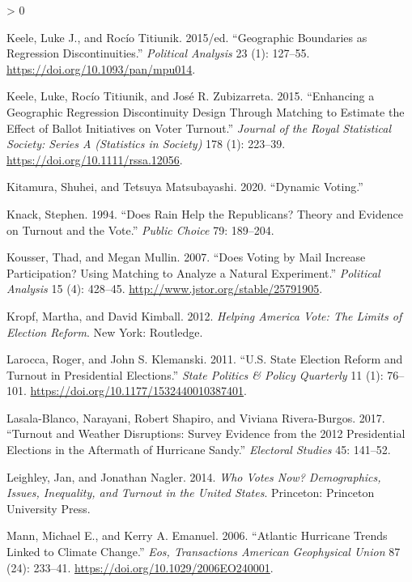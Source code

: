 \documentclass[
  12pt,
]{article}
\newlength{\cslhangindent}
\newenvironment{CSLReferences}[2] %
 {%
  \setlength{\parindent}{0pt}
  \ifodd #1 \everypar{\setlength{\hangindent}{\cslhangindent}}\ignorespaces\fi
  \ifnum #2 > 0
  \setlength{\parskip}{#2\baselineskip}
  \fi
 }%
 {}
\begin{document}
\begin{CSLReferences}{1}{0}
\leavevmode\hypertarget{ref-Keele2015}{}%
Keele, Luke J., and Rocío Titiunik. 2015/ed. {``Geographic {Boundaries} as {Regression Discontinuities}.''} \emph{Political Analysis} 23 (1): 127--55. \url{https://doi.org/10.1093/pan/mpu014}.

\leavevmode\hypertarget{ref-Keele2015a}{}%
Keele, Luke, Rocío Titiunik, and José R. Zubizarreta. 2015. {``Enhancing a Geographic Regression Discontinuity Design Through Matching to Estimate the Effect of Ballot Initiatives on Voter Turnout.''} \emph{Journal of the Royal Statistical Society: Series A (Statistics in Society)} 178 (1): 223--39. \url{https://doi.org/10.1111/rssa.12056}.

\leavevmode\hypertarget{ref-Kitamura2020}{}%
Kitamura, Shuhei, and Tetsuya Matsubayashi. 2020. {``Dynamic {Voting}.''}

\leavevmode\hypertarget{ref-Knack1994}{}%
Knack, Stephen. 1994. {``Does {Rain Help} the {Republicans}? {Theory} and {Evidence} on {Turnout} and the {Vote}.''} \emph{Public Choice} 79: 189--204.

\leavevmode\hypertarget{ref-Kousser2007}{}%
Kousser, Thad, and Megan Mullin. 2007. {``Does {Voting} by {Mail Increase Participation}? {Using Matching} to {Analyze} a {Natural Experiment}.''} \emph{Political Analysis} 15 (4): 428--45. \url{http://www.jstor.org/stable/25791905}.

\leavevmode\hypertarget{ref-Kropf2012}{}%
Kropf, Martha, and David Kimball. 2012. \emph{Helping {America Vote}: {The Limits} of {Election Reform}}. {New York}: {Routledge}.

\leavevmode\hypertarget{ref-Larocca2011}{}%
Larocca, Roger, and John S. Klemanski. 2011. {``U.{S}. {State Election Reform} and {Turnout} in {Presidential Elections}.''} \emph{State Politics \& Policy Quarterly} 11 (1): 76--101. \url{https://doi.org/10.1177/1532440010387401}.

\leavevmode\hypertarget{ref-Lasala-Blanco2017}{}%
Lasala-Blanco, Narayani, Robert Shapiro, and Viviana Rivera-Burgos. 2017. {``Turnout and {Weather Disruptions}: {Survey Evidence} from the 2012 {Presidential Elections} in the {Aftermath} of {Hurricane Sandy}.''} \emph{Electoral Studies} 45: 141--52.

\leavevmode\hypertarget{ref-Leighley2014}{}%
Leighley, Jan, and Jonathan Nagler. 2014. \emph{Who {Votes Now}? {Demographics}, {Issues}, {Inequality}, and {Turnout} in the {United States}}. {Princeton}: {Princeton University Press}.

\leavevmode\hypertarget{ref-Mann2006}{}%
Mann, Michael E., and Kerry A. Emanuel. 2006. {``Atlantic Hurricane Trends Linked to Climate Change.''} \emph{Eos, Transactions American Geophysical Union} 87 (24): 233--41. \url{https://doi.org/10.1029/2006EO240001}.


\end{CSLReferences}
\end{document}
